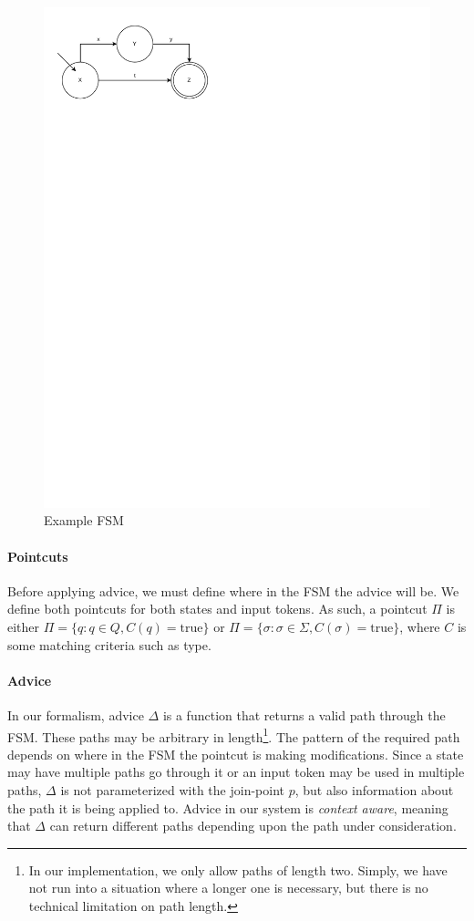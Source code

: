 \documentclass[sigplan,anonymous,review]{acmart}
\begin{document}
\begin{figure}[htb]
    \centering
    \includegraphics{figures/ExampleFSM.pdf}
    \caption{Example FSM}
    \label{fig:example}
\end{figure}

\paragraph{Pointcuts} Before applying advice, we must define where in the FSM the advice will be. We define both pointcuts for both states and input tokens. As such, a pointcut $\Pi$ is either $\Pi = \{q : q \in Q, C(q) = \mathrm{true}\}$ or $\Pi = \{\sigma : \sigma \in \Sigma, C(\sigma) = \mathrm{true}\}$, where $C$ is some matching criteria such as type.

\paragraph{Advice} In our formalism, advice $\Delta$ is a function that returns a valid path through the FSM. These paths may be arbitrary in length\footnote{In our implementation, we only allow paths of length two. Simply, we have not run into a situation where a longer one is necessary, but there is no technical limitation on path length.}. The pattern of the required path depends on where in the FSM the pointcut is making modifications. Since a state may have multiple paths go through it or an input token may be used in multiple paths, $\Delta$ is not parameterized with the join-point $p$, but also information about the path it is being applied to. Advice in our system is \emph{context aware}, meaning that $\Delta$ can return different paths depending upon the path under consideration. 
\end{document}
